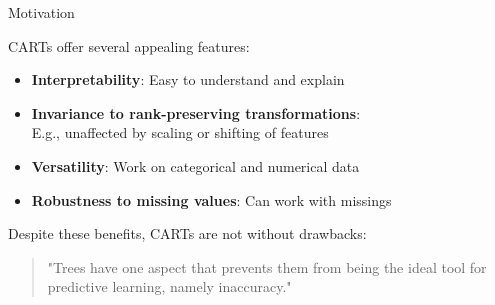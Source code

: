 \documentclass[11pt,compress,t,notes=noshow, xcolor=table]{beamer}
\begin{document}

\begin{framev}{Motivation}

CARTs offer several appealing features:

\begin{itemize}
  \item \textbf{Interpretability}: Easy to understand and explain
  \item \textbf{Invariance to rank-preserving transformations}: \\
    E.g., unaffected by scaling or shifting of features
  \item \textbf{Versatility}: Work on categorical and numerical data
  \item \textbf{Robustness to missing values}: Can work with missings
\end{itemize}

\lz \lz

Despite these benefits, CARTs are not without drawbacks:

\lz

\begin{quotation}
"Trees have one aspect that prevents them from being the ideal tool for predictive learning, namely inaccuracy."
\end{quotation}

\end{framev}
\end{document}
